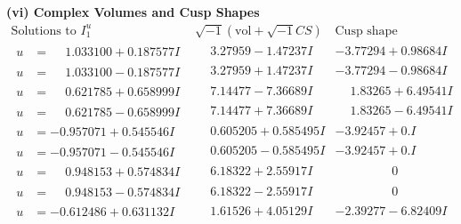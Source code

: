 \documentclass[1p]{elsarticle_modified}
\theoremstyle{definition}
\newcommand{\I}{\sqrt{-1}}
\begin{document}
\newpage\flushleft \textbf{(vi) Complex Volumes and Cusp Shapes}
$$\begin{array}{c|c|c}  
\text{Solutions to }I^u_{1}& \I (\text{vol} + \sqrt{-1}CS) & \text{Cusp shape}\\
 \hline 
\begin{aligned}
u &= \phantom{-}1.033100 + 0.187577 I\end{aligned}
 & \phantom{-}3.27959 - 1.47237 I & -3.77294 + 0.98684 I \\ \hline\begin{aligned}
u &= \phantom{-}1.033100 - 0.187577 I\end{aligned}
 & \phantom{-}3.27959 + 1.47237 I & -3.77294 - 0.98684 I \\ \hline\begin{aligned}
u &= \phantom{-}0.621785 + 0.658999 I\end{aligned}
 & \phantom{-}7.14477 - 7.36689 I & \phantom{-}1.83265 + 6.49541 I \\ \hline\begin{aligned}
u &= \phantom{-}0.621785 - 0.658999 I\end{aligned}
 & \phantom{-}7.14477 + 7.36689 I & \phantom{-}1.83265 - 6.49541 I \\ \hline\begin{aligned}
u &= -0.957071 + 0.545546 I\end{aligned}
 & \phantom{-}0.605205 + 0.585495 I & -3.92457 + 0. I\phantom{ +0.000000I} \\ \hline\begin{aligned}
u &= -0.957071 - 0.545546 I\end{aligned}
 & \phantom{-}0.605205 - 0.585495 I & -3.92457 + 0. I\phantom{ +0.000000I} \\ \hline\begin{aligned}
u &= \phantom{-}0.948153 + 0.574834 I\end{aligned}
 & \phantom{-}6.18322 + 2.55917 I & \phantom{-0.000000 } 0 \\ \hline\begin{aligned}
u &= \phantom{-}0.948153 - 0.574834 I\end{aligned}
 & \phantom{-}6.18322 - 2.55917 I & \phantom{-0.000000 } 0 \\ \hline\begin{aligned}
u &= -0.612486 + 0.631132 I\end{aligned}
 & \phantom{-}1.61526 + 4.05129 I & -2.39277 - 6.82409 I \\ \hline\begin{aligned}

\end{aligned}
\end{array}$$
\end{document}
